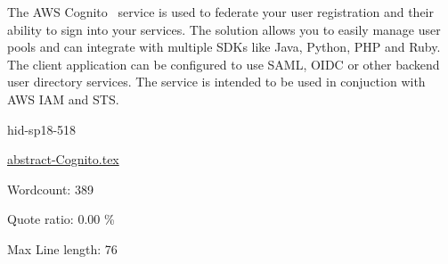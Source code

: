 The AWS Cognito~\cite{hid-sp18-518-Cognito} service is used to federate your
user registration and their ability to sign into your services. The solution
allows you to easily manage user pools and can integrate with multiple SDKs 
like Java, Python, PHP and Ruby. The client application can be configured to
use SAML, OIDC or other backend user directory services. The service is 
intended to be used in conjuction with AWS IAM and STS.











\begin{IU}

hid-sp18-518

\href{https://github.com/cloudmesh-community/hid-sp18-518/blob/master//technology/abstract-Cognito.tex}{abstract-Cognito.tex}

 

Wordcount: 389


Quote ratio: 0.00 \%
 
Max Line length: 76
\end{IU}

